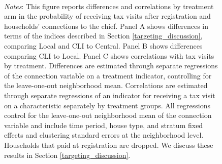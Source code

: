 \documentclass[12pt,english]{article}
\renewcommand{\footnotesize}{\fontsize{9pt}{11pt}\selectfont}\usepackage[unicode=true,
\begin{document}
\begin{figure}[H]
\begin{tabular}{c}
\end{tabular}
\usebox{\tablebox}\\[1ex]
\parbox{6in}{\footnotesize \textit{Notes}: This figure reports differences and correlations by treatment arm in the probability of receiving tax visits after registration and households' connections to the chief. Panel A shows differences in terms of the indices described in Section \ref{targeting_discussion}, comparing Local and CLI to Central.  Panel B shows differences comparing CLI to Local. Panel C shows correlations with tax visits by treatment.  Differences are estimated through separate regressions of the connection variable on a treatment indicator, controlling for the leave-one-out neighborhood mean.  Correlations are estimated through separate regressions of an indicator for receiving a tax visit on a characteristic separately by treatment groups.   All regressions control for the leave-one-out neighborhood mean of the connection variable and include time period, house type, and stratum fixed effects and clustering standard errors at the neighborhood level.  Households that paid at registration are dropped. We discuss these results in Section \ref{targeting_discussion}.}
\end{figure}


\clearpage



\end{document}
